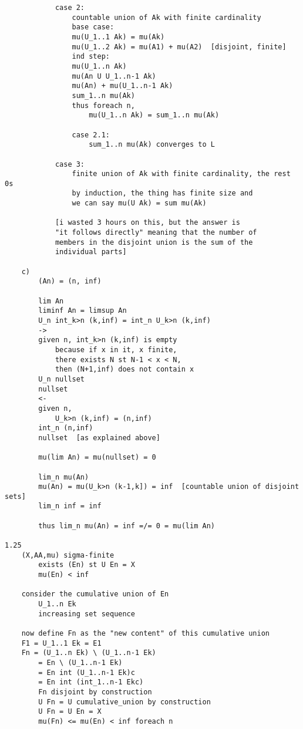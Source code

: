 \documentclass{article}
\begin{document}
\begin{flushleft}
\begin{verbatim}
            case 2: 
                countable union of Ak with finite cardinality 
                base case:
                mu(U_1..1 Ak) = mu(Ak) 
                mu(U_1..2 Ak) = mu(A1) + mu(A2)  [disjoint, finite] 
                ind step:
                mu(U_1..n Ak)
                mu(An U U_1..n-1 Ak)  
                mu(An) + mu(U_1..n-1 Ak)
                sum_1..n mu(Ak)
                thus foreach n, 
                    mu(U_1..n Ak) = sum_1..n mu(Ak)

                case 2.1: 
                    sum_1..n mu(Ak) converges to L 

            case 3:
                finite union of Ak with finite cardinality, the rest 0s
                by induction, the thing has finite size and 
                we can say mu(U Ak) = sum mu(Ak)

            [i wasted 3 hours on this, but the answer is 
            "it follows directly" meaning that the number of 
            members in the disjoint union is the sum of the 
            individual parts]

    c)
        (An) = (n, inf)

        lim An 
        liminf An = limsup An 
        U_n int_k>n (k,inf) = int_n U_k>n (k,inf)
        ->
        given n, int_k>n (k,inf) is empty 
            because if x in it, x finite, 
            there exists N st N-1 < x < N, 
            then (N+1,inf) does not contain x 
        U_n nullset 
        nullset 
        <- 
        given n, 
            U_k>n (k,inf) = (n,inf)
        int_n (n,inf)
        nullset  [as explained above]

        mu(lim An) = mu(nullset) = 0 

        lim_n mu(An)
        mu(An) = mu(U_k>n (k-1,k]) = inf  [countable union of disjoint sets]
        lim_n inf = inf 

        thus lim_n mu(An) = inf =/= 0 = mu(lim An)

1.25
    (X,AA,mu) sigma-finite 
        exists (En) st U En = X
        mu(En) < inf 

    consider the cumulative union of En
        U_1..n Ek 
        increasing set sequence 

    now define Fn as the "new content" of this cumulative union 
    F1 = U_1..1 Ek = E1 
    Fn = (U_1..n Ek) \ (U_1..n-1 Ek)
        = En \ (U_1..n-1 Ek)
        = En int (U_1..n-1 Ek)c
        = En int (int_1..n-1 Ekc)
        Fn disjoint by construction 
        U Fn = U cumulative_union by construction 
        U Fn = U En = X 
        mu(Fn) <= mu(En) < inf foreach n 


\end{verbatim}
\end{flushleft}
\end{document}
